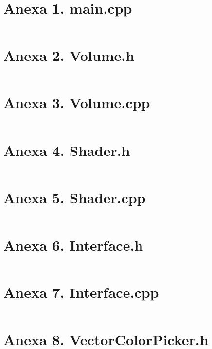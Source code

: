 
\section{Anexa 1. main.cpp}
\label{appendix:1_main_cpp}
\inputminted[linenos,tabsize=4,breaklines]{C++}{code/cpp/main.cpp}

\section{Anexa 2. Volume.h}
\label{appendix:2_volume_h}
\inputminted[linenos,tabsize=4,breaklines]{C++}{code/cpp/Volume.h}

\section{Anexa 3. Volume.cpp}
\label{appendix:3_volume_cpp}
\inputminted[linenos,tabsize=4,breaklines]{C++}{code/cpp/Volume.cpp}

\section{Anexa 4. Shader.h}
\label{appendix:4_shader_h}
\inputminted[linenos,tabsize=4,breaklines]{C++}{code/cpp/Shader.h}

\section{Anexa 5. Shader.cpp}
\label{appendix:5_shader_cpp}
\inputminted[linenos,tabsize=4,breaklines]{C++}{code/cpp/Shader.cpp}

\section{Anexa 6. Interface.h}
\label{appendix:6_interface_h}
\inputminted[linenos,tabsize=4,breaklines]{C++}{code/cpp/Interface.h}

\section{Anexa 7. Interface.cpp}
\label{appendix:7_interface_cpp}
\inputminted[linenos,tabsize=4,breaklines]{C++}{code/cpp/Interface.cpp}

\section{Anexa 8. VectorColorPicker.h}
\label{appendix:8_tfwidget_h}
\inputminted[linenos,tabsize=4,breaklines]{C++}{code/cpp/VectorColorPicker.h}

